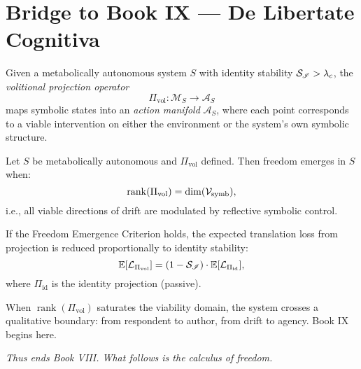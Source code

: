 \section[Bridge to Book IX]{Bridge to Book IX — De Libertate Cognitiva}
\label{sec:bk8_bridge_to_book_ix}
\begin{definition}
\label{definition:bk8_violation_projection_operator}
Given a metabolically autonomous system $S$ with identity stability $\mathcal{S}_{\mathscr{I}} > \lambda_c$, the \emph{volitional projection operator}
\[
\Pi_{\text{vol}} : \mathcal{M}_S \to \mathcal{A}_S
\]
maps symbolic states into an \emph{action manifold} $\mathcal{A}_S$, where each point corresponds to a viable intervention on either the environment or the system’s own symbolic structure.
\end{definition}
\begin{theorem}
\label{theorem:bk8_freedom_emergence_criterion}
Let $S$ be metabolically autonomous and $\Pi_{\text{vol}}$ defined. Then freedom emerges in $S$ when:
\[
\operatorname{rank}(\Pi_{\text{vol}}) = \dim(\mathcal{V}_{\mathrm{symb}}),
\]
i.e., all viable directions of drift are modulated by reflective symbolic control.
\end{theorem}
\begin{corollary}
\label{corollary:bk8_symbolic_free_will}
If the Freedom Emergence Criterion holds, the expected translation loss from projection is reduced proportionally to identity stability:
\[
\mathbb{E}[\mathcal{L}_{\Pi_{\text{vol}}}] = (1 - \mathcal{S}_{\mathscr{I}}) \cdot \mathbb{E}[\mathcal{L}_{\Pi_{\text{id}}}],
\]
where $\Pi_{\text{id}}$ is the identity projection (passive).
\end{corollary}
\begin{scholium}
\label{scholium:bk8_threshold_crossing}
When $\operatorname{rank}(\Pi_{\text{vol}})$ saturates the viability domain, the system crosses a qualitative boundary: from respondent to author, from drift to agency. Book IX begins here.
\end{scholium}
\vspace{1em}
\begin{center}
    \emph{Thus ends Book VIII. What follows is the calculus of freedom.}
\end{center}
